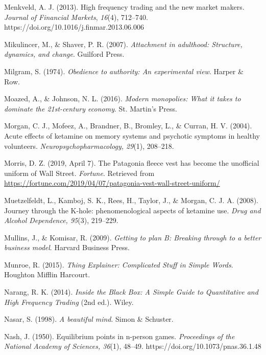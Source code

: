\begin{thebibliography}{}
    Menkveld, A. J. (2013). High frequency trading and the new market makers. \textit{Journal of Financial Markets}, \textit{16}(4), 712–740. https://doi.org/10.1016/j.finmar.2013.06.006

    Mikulincer, M., \& Shaver, P. R. (2007). \textit{Attachment in adulthood: Structure, dynamics, and change}. Guilford Press.

    Milgram, S. (1974). \textit{Obedience to authority: An experimental view}. Harper \& Row.

    Moazed, A., \& Johnson, N. L. (2016). \textit{Modern monopolies: What it takes to dominate the 21st-century economy}. St. Martin’s Press.

    Morgan, C. J., Mofeez, A., Brandner, B., Bromley, L., \& Curran, H. V. (2004). Acute effects of ketamine on memory systems and psychotic symptoms in healthy volunteers. \textit{Neuropsychopharmacology, 29}(1), 208–218.

    Morris, D. Z. (2019, April 7). The Patagonia fleece vest has become the unofficial uniform of Wall Street. \textit{Fortune}. Retrieved from \url{https://fortune.com/2019/04/07/patagonia-vest-wall-street-uniform/}

    Muetzelfeldt, L., Kamboj, S. K., Rees, H., Taylor, J., \& Morgan, C. J. A. (2008). Journey through the K-hole: phenomenological aspects of ketamine use. \textit{Drug and Alcohol Dependence, 95}(3), 219–229.

    Mullins, J., \& Komisar, R. (2009). \textit{Getting to plan B: Breaking through to a better business model}. Harvard Business Press.

    Munroe, R. (2015). \textit{Thing Explainer: Complicated Stuff in Simple Words}. Houghton Mifflin Harcourt.


    Narang, R. K. (2014). \textit{Inside the Black Box: A Simple Guide to Quantitative and High Frequency Trading} (2nd ed.). Wiley.

    Nasar, S. (1998). \textit{A beautiful mind}. Simon \& Schuster.

    Nash, J. (1950). Equilibrium points in n-person games. \textit{Proceedings of the National Academy of Sciences, 36}(1), 48–49. https://doi.org/10.1073/pnas.36.1.48


\end{thebibliography}
